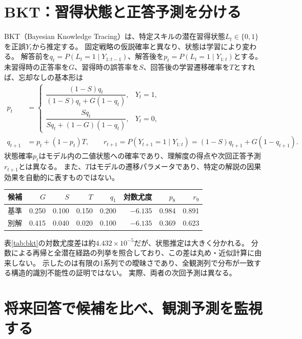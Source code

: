 \documentclass[10pt,a4paper]{article}
\newcommand{\given}{\mid}
\begin{document}
\section{BKT：習得状態と正答予測を分ける}
BKT（Bayesian Knowledge Tracing）は、特定スキルの潜在習得状態$L_t\in\{0,1\}$を正誤$Y_t$から推定する\cite{corbett}。
固定戦略の仮説確率と異なり、状態は学習により変わる。
解答前を$q_t=P(L_t=1\given Y_{1:t-1})$、解答後を$p_t=P(L_t=1\given Y_{1:t})$とする。
未習得時の正答率を$G$、習得時の誤答率を$S$、回答後の学習遷移確率を$T$とすれば、忘却なしの基本形は
\begin{align}
 p_t&=\begin{cases}
 \dfrac{(1-S)q_t}{(1-S)q_t+G(1-q_t)},&Y_t=1,\\[3pt]
 \dfrac{Sq_t}{Sq_t+(1-G)(1-q_t)},&Y_t=0,
 \end{cases}\\[-2pt]
 q_{t+1}&=p_t+(1-p_t)T,\qquad
 r_{t+1}=P(Y_{t+1}=1\given Y_{1:t})=(1-S)q_{t+1}+G(1-q_{t+1}).
 \label{eq:bkt}
\end{align}
状態確率$p_t$はモデル内の二値状態への確率であり、理解度の得点や次回正答予測$r_{t+1}$とは異なる。
また、$T$はモデルの遷移パラメータであり、特定の解説の因果効果を自動的に表すものではない。

\begin{center}
\label{tab:bkt}
\small\setlength{\tabcolsep}{5pt}
\begin{tabular*}{0.97\linewidth}{@{\extracolsep{\fill}}lrrrrrrr@{}}
\toprule 候補 & $G$ & $S$ & $T$ & $q_1$ & 対数尤度 & $p_8$ & $r_9$\\
\midrule 基準 & 0.250 & 0.100 & 0.150 & 0.200 & $-6.135$ & 0.984 & 0.891\\
別解 & 0.415 & 0.040 & 0.020 & 0.100 & $-6.135$ & 0.369 & 0.623\\
\bottomrule
\end{tabular*}
\end{center}
表\ref{tab:bkt}の対数尤度差は約$4.432\times10^{-5}$だが、状態推定は大きく分かれる。
分数による再帰と全潜在経路の列挙を照合しており、この差は丸め・近似計算に由来しない。
示したのは有限の1系列での曖昧さであり\cite{beck}、全観測列で分布が一致する構造的識別不能性の証明ではない。
実際、両者の次回予測は異なる。


\newpage
\section{将来回答で候補を比べ、観測予測を監視する}
\end{document}
